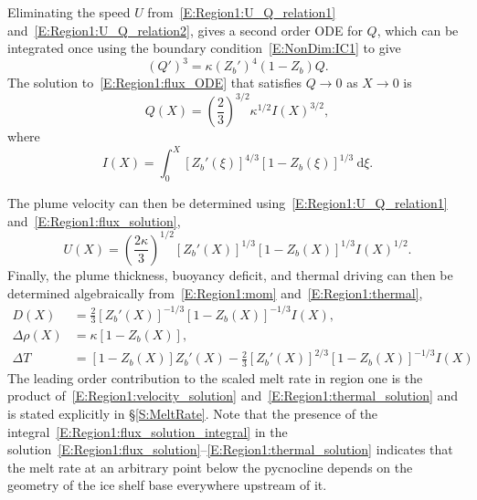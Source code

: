 \documentclass[openacc]{rsproca_new}%
\begin{document}
Eliminating the speed $U$ from~\eqref{E:Region1:U_Q_relation1} and~\eqref{E:Region1:U_Q_relation2}, gives a second order ODE for $Q$, which can be integrated once using the boundary condition~\eqref{E:NonDim:IC1} to give
\begin{equation}\label{E:Region1:flux_ODE}
(Q')^3 = \kappa\left(Z_b'\right)^4 \left(1-Z_b\right)Q.
\end{equation}
The solution to~\eqref{E:Region1:flux_ODE} that satisfies $Q \to 0$ as $X \to 0$ is
\begin{equation}\label{E:Region1:flux_solution}
Q(X) =  \left(\frac{2}{3}\right)^{3/2} \kappa^{1/2}I(X)^{3/2},
\end{equation}
where 
\begin{equation}\label{E:Region1:flux_solution_integral}
I(X) =  \int_0^X \left[Z_b'(\xi)\right]^{4/3}\left[1 - Z_b(\xi)\right]^{1/3}~\mathrm{d}\xi.
\end{equation}

The plume velocity can then be determined using~\eqref{E:Region1:U_Q_relation1} and~\eqref{E:Region1:flux_solution},
\begin{equation}\label{E:Region1:velocity_solution}
U(X) =\left(\frac{2\kappa}{3}\right)^{1/2}\left[Z_b'(X)\right]^{1/3}\left[1 - Z_b(X)\right]^{1/3}I(X)^{1/2}.
\end{equation}
Finally, the plume thickness, buoyancy deficit, and thermal driving can then be determined algebraically from~\eqref{E:Region1:mom} and~\eqref{E:Region1:thermal},
\begin{align}
D(X) &= \frac{2}{3}\left[Z_b'(X)\right]^{-1/3}\left[1 - Z_b(X)\right]^{-1/3}I(X),\label{E:Region1:thickness_solution}\\
\Delta \rho(X) &= \kappa \left[ 1- Z_b(X)\right],\label{E:Region1:buoyancy_solution}\\
\Delta T &= \left[1-Z_b(X)\right]Z_b'(X) - \frac{2}{3}\left[Z_b'(X)\right]^{2/3} \left[1-Z_b(X)\right]^{-1/3}I(X) \label{E:Region1:thermal_solution}
\end{align}
The leading order contribution to the scaled melt rate in region one is the product of~\eqref{E:Region1:velocity_solution} and~\eqref{E:Region1:thermal_solution} and is stated explicitly in \S\ref{S:MeltRate}. Note that the presence of the integral~\eqref{E:Region1:flux_solution_integral}  in the solution~\eqref{E:Region1:flux_solution}--\eqref{E:Region1:thermal_solution} indicates that the melt rate at an arbitrary point below the pycnocline depends on the geometry of the ice shelf base everywhere upstream of it.
\end{document}
